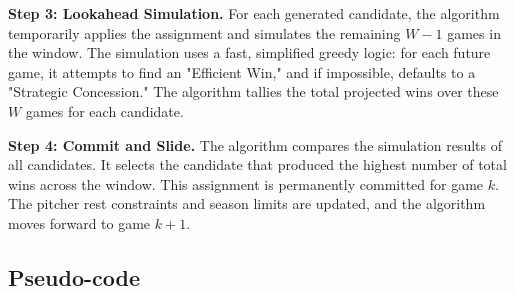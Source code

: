\documentclass[11pt, a4paper]{article}
\begin{document}
\textbf{Step 3: Lookahead Simulation.} For each generated candidate, the algorithm temporarily applies the assignment and simulates the remaining $W-1$ games in the window. The simulation uses a fast, simplified greedy logic: for each future game, it attempts to find an "Efficient Win," and if impossible, defaults to a "Strategic Concession." The algorithm tallies the total projected wins over these $W$ games for each candidate.

\textbf{Step 4: Commit and Slide.} The algorithm compares the simulation results of all candidates. It selects the candidate that produced the highest number of total wins across the window. This assignment is permanently committed for game $k$. The pitcher rest constraints and season limits are updated, and the algorithm moves forward to game $k+1$.

\subsection{Pseudo-code}
\end{document}
